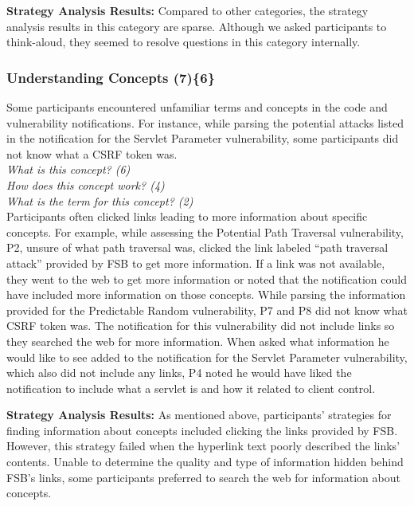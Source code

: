 \documentclass[10pt,journal,compsoc]{IEEEtran}
\begin{document}
\textbf{Strategy Analysis Results:}
Compared to other categories, the strategy analysis results in this category are sparse.
Although we asked participants to think-aloud, they seemed to resolve questions in this category internally. 



\subsubsection{Understanding Concepts (7)\{6\}}\label{uc}

Some participants encountered unfamiliar terms and concepts in the code and vulnerability notifications.
For instance, while parsing the potential attacks listed in the notification for the Servlet Parameter vulnerability, some participants did not know what a CSRF token was.
\\

\noindent\emph{What is this concept? (6)} \\
\emph{How does this concept work? (4)} \\
\emph{What is the term for this concept? (2)}
\\


Participants often clicked links leading to more information about specific concepts.
For example, while assessing the Potential Path Traversal vulnerability, P2, unsure of what path traversal was, clicked the link labeled ``path traversal attack'' provided by FSB to get more information.
If a link was not available, they went to the web to get more information or noted that the notification could have included more information on those concepts.
While parsing the information provided for the Predictable Random vulnerability, P7 and P8 did not know what CSRF token was.
The notification for this vulnerability did not include links so they searched the web for more information. 
When asked what information he would like to see added to the notification for the Servlet Parameter vulnerability, which also did not include any links, P4 noted he would have liked the notification to include what a servlet is and how it related to client control.


\textbf{Strategy Analysis Results:}
As mentioned above, participants' strategies for finding information about concepts included clicking the links provided by FSB.
However, this strategy failed when the hyperlink text poorly described the links' contents.
Unable to determine the quality and type of information hidden behind FSB's links, some participants preferred to search the web for information about concepts.
\end{document}
